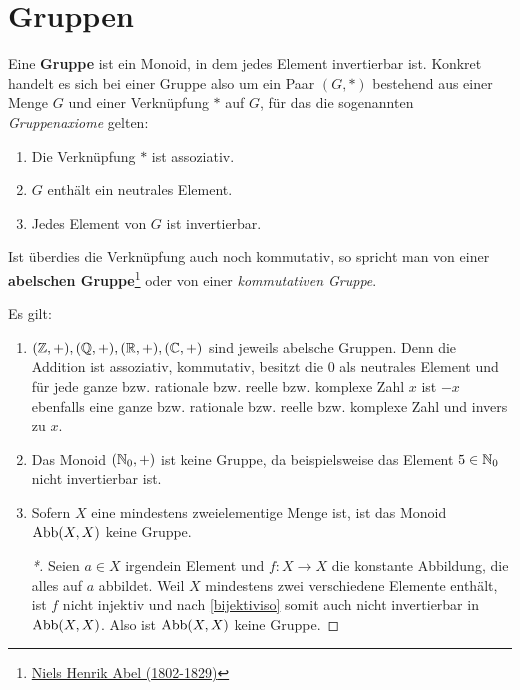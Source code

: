 \section{Gruppen}


\begin{defin}[Gruppe]  
    Eine \textbf{Gruppe} ist ein Monoid, in dem jedes Element invertierbar ist. Konkret handelt es sich bei einer Gruppe also um ein Paar $(G,*)$ bestehend aus einer Menge $G$ und einer Verknüpfung $*$ auf $G$, für das die sogenannten \emph{Gruppenaxiome} gelten:
    \begin{enumerate}[(G1), labelindent=1.5em, leftmargin=*]
        \item Die Verknüpfung $*$ ist assoziativ.
        \item $G$ enthält ein neutrales Element.
        \item Jedes Element von $G$ ist invertierbar.
    \end{enumerate}
    Ist überdies die Verknüpfung auch noch kommutativ, so spricht man von einer \textbf{abelschen Gruppe}\footnote{\href{https://de.wikipedia.org/wiki/Niels_Henrik_Abel}{Niels Henrik Abel (1802-1829)}} oder von einer \emph{kommutativen Gruppe}.
\end{defin}


\begin{bsp}
    Es gilt:
    \begin{enumerate}
        \item $(\mathbb Z,+),(\mathbb Q,+),(\mathbb R,+),(\mathbb C,+)$ sind jeweils abelsche Gruppen. Denn die Addition ist assoziativ, kommutativ, besitzt die $0$ als neutrales Element und für jede ganze bzw. rationale bzw. reelle bzw. komplexe Zahl $x$ ist $-x$ ebenfalls eine ganze bzw. rationale bzw. reelle bzw. komplexe Zahl und invers zu $x$.
        \item Das Monoid $(\mathbb N_0,+)$ ist keine Gruppe, da beispielsweise das Element $5\in \mathbb N_0$ nicht invertierbar ist.
        \item Sofern $X$ eine mindestens zweielementige Menge ist, ist das Monoid $\operatorname{Abb}(X,X)$ keine Gruppe.
        \begin{proof}[*]
            Seien $a\in X$ irgendein Element und $f:X\to X$ die konstante Abbildung, die alles auf $a$ abbildet. Weil $X$ mindestens zwei verschiedene Elemente enthält, ist $f$ nicht injektiv und nach \cref{bijektiviso} somit auch nicht invertierbar in $\operatorname{Abb}(X,X)$. Also ist $\operatorname{Abb}(X,X)$ keine Gruppe.
        \end{proof}
    \end{enumerate}
\end{bsp}


